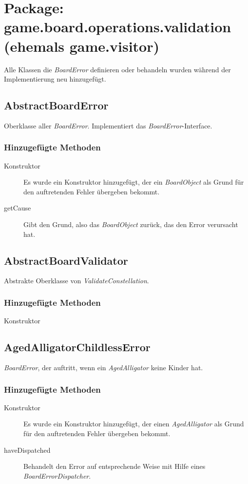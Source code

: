 \section{Package: game.board.operations.validation (ehemals game.visitor)}
Alle Klassen die \emph{BoardError} definieren oder behandeln wurden während der Implementierung neu hinzugefügt.
\subsection{AbstractBoardError}
	Oberklasse aller \emph{BoardError}. Implementiert das \emph{BoardError}-Interface.
	\subsubsection{Hinzugefügte Methoden}
	\begin{description}
		\item[Konstruktor] Es wurde ein Konstruktor hinzugefügt, der ein \emph{BoardObject} als Grund für den auftretenden 
			Fehler übergeben bekommt.
		\item[getCause]
			Gibt den Grund, also das \emph{BoardObject} zurück, das den Error verursacht hat.
	\end{description}

\subsection{AbstractBoardValidator}
Abstrakte Oberklasse von \emph{ValidateConstellation}.
	\subsubsection{Hinzugefügte Methoden}
	\begin{description}
		\item[Konstruktor] 
	\end{description}

\subsection{AgedAlligatorChildlessError}
	\emph{BoardError}, der auftritt, wenn ein \emph{AgedAlligator} keine Kinder hat.
	\subsubsection{Hinzugefügte Methoden}
	\begin{description}
		\item[Konstruktor] Es wurde ein Konstruktor hinzugefügt, der einen \emph{AgedAlligator} als Grund für den auftretenden 
			Fehler übergeben bekommt.
		\item[haveDispatched]
			Behandelt den Error auf entsprechende Weise mit Hilfe eines \emph{BoardErrorDispatcher}.
	\end{description}

